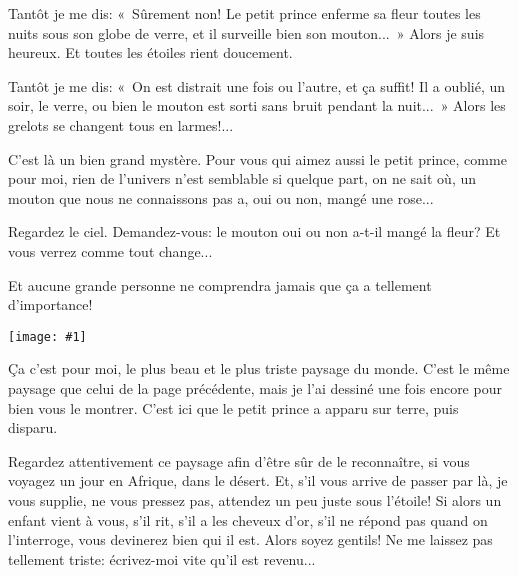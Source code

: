 \documentclass{report}
\newcommand{\incpic}[1]{%
\begin{center}
    \texttt{[image: \#1]}
\end{center}%
}
\begin{document}
Tantôt je me dis: «~Sûrement non! Le petit prince enferme sa fleur toutes les nuits sous son globe de verre, et il surveille bien son mouton...~» Alors je suis heureux. Et toutes les étoiles rient doucement.

Tantôt je me dis: «~On est distrait une fois ou l'autre, et ça suffit! Il a oublié, un soir, le verre, ou bien le mouton est sorti sans bruit pendant la nuit...~» Alors les grelots se changent tous en larmes!...

C'est là un bien grand mystère. Pour vous qui aimez aussi le petit prince, comme pour moi, rien de l'univers n'est semblable si quelque part, on ne sait où, un mouton que nous ne connaissons pas a, oui ou non, mangé une rose...

Regardez le ciel. Demandez-vous: le mouton oui ou non a-t-il mangé la fleur? Et vous verrez comme tout change...

Et aucune grande personne ne comprendra jamais que ça a tellement d'importance!

\incpic{pic/image46.jpeg}

Ça c'est pour moi, le plus beau et le plus triste paysage du monde. C'est le même paysage que celui de la page précédente, mais je l'ai dessiné une fois encore pour bien vous le montrer. C'est ici que le petit prince a apparu sur terre, puis disparu.

Regardez attentivement ce paysage afin d'être sûr de le reconnaître, si vous voyagez un jour en Afrique, dans le désert. Et, s'il vous arrive de passer par là, je vous supplie, ne vous pressez pas, attendez un peu juste sous l'étoile! Si alors un enfant vient à vous, s'il rit, s'il a les cheveux d'or, s'il ne répond pas quand on l'interroge, vous devinerez bien qui il est. Alors soyez gentils! Ne me laissez pas tellement triste: écrivez-moi vite qu'il est revenu...
\end{document}
